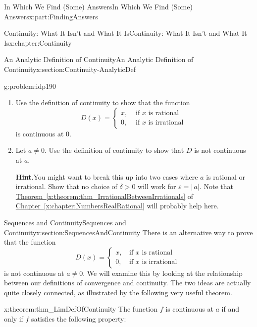 \documentclass[oneside,10pt,]{book}
\newcommand{\blocktitlefont}{\relax}
\newcommand{\xreffont}{\relax}
\numberwithin{equation}{section}
\newcommand{\eps}{\varepsilon}
\newcommand{\amp}{&}
\begin{document}
\begin{partptx}{In Which We Find (Some) Answers}{}{In Which We Find (Some) Answers}{}{}{x:part:FindingAnswers}
\begin{chapterptx}{Continuity: What It Isn't and What It Is}{}{Continuity: What It Isn't and What It Is}{}{}{x:chapter:Continuity}
\begin{sectionptx}{An Analytic Definition of Continuity}{}{An Analytic Definition of Continuity}{}{}{x:section:Continuity-AnalyticDef}
\begin{problem}{}{g:problem:idp190}
\begin{enumerate}[font=\bfseries,label=(\alph*),ref=\alph*]
\item{}Use the definition of continuity to show that the function%
\begin{equation*}
D(x)= \begin{cases}
x,\amp \text{ if } x\text{ is rational } \\
0,\amp \text{ if } x\text{ is irrational } \end{cases} 
\end{equation*}
is continuous at \(0\).%
\item{}Let \(a\neq 0\).  Use the definition of continuity to show that \(D\) is not continuous at \(a\).%
\par\smallskip%
\noindent\textbf{\blocktitlefont Hint}.\hypertarget{g:hint:idp191}{}\quad{}You might want to break this up into two cases where \(a\) is rational or irrational.  Show that no choice of \(\delta>0\) will work for \(\eps=|\,a|\).  Note that \hyperref[x:theorem:thm_IrrationalBetweenIrrationals]{Theorem~{\xreffont\ref{x:theorem:thm_IrrationalBetweenIrrationals}}} of \hyperref[x:chapter:NumbersRealRational]{Chapter~{\xreffont\ref{x:chapter:NumbersRealRational}}} will probably help here.%
\end{enumerate}
\end{problem}
\end{sectionptx}
%
%
\typeout{************************************************}
\typeout{************************************************}
%
\begin{sectionptx}{Sequences and Continuity}{}{Sequences and Continuity}{}{}{x:section:SequencesAndContinuity}
There is an alternative way to prove that the function%
\begin{equation*}
D(x)=\left\{ \begin{matrix}x\text{,} \amp \text{ if } x\text{ is rational } \\ 0\text{,} \amp \text{ if } x\text{ is irrational } \end{matrix} \right.
\end{equation*}
is not continuous at \(a\neq 0\).  We will examine this by looking at the relationship between our definitions of convergence and continuity.  The two ideas are actually quite closely connected, as illustrated by the following very useful theorem.%
\begin{theorem}{}{}{x:theorem:thm_LimDefOfContinuity}%
 The function \(f\) is continuous at \(a\) if and only if \(f\) satisfies the following property:%

\end{theorem}
\end{sectionptx}
\end{chapterptx}
\end{partptx}
\end{document}
